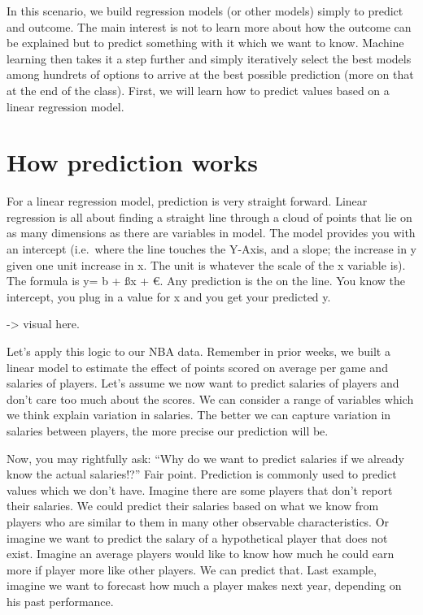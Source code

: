 \documentclass[
]{book}
\begin{document}
In this scenario, we build regression models (or other models) simply to predict and outcome. The main interest is not to learn more about how the outcome can be explained but to predict something with it which we want to know. Machine learning then takes it a step further and simply iteratively select the best models among hundrets of options to arrive at the best possible prediction (more on that at the end of the class). First, we will learn how to predict values based on a linear regression model.

\hypertarget{how-prediction-works}{%
\section{How prediction works}\label{how-prediction-works}}

For a linear regression model, prediction is very straight forward. Linear regression is all about finding a straight line through a cloud of points that lie on as many dimensions as there are variables in model. The model provides you with an intercept (i.e.~where the line touches the Y-Axis, and a slope; the increase in y given one unit increase in x. The unit is whatever the scale of the x variable is). The formula is y= b + ßx + €. Any prediction is the on the line. You know the intercept, you plug in a value for x and you get your predicted y.

-\textgreater{} visual here.

Let's apply this logic to our NBA data. Remember in prior weeks, we built a linear model to estimate the effect of points scored on average per game and salaries of players. Let's assume we now want to predict salaries of players and don't care too much about the scores. We can consider a range of variables which we think explain variation in salaries. The better we can capture variation in salaries between players, the more precise our prediction will be.

Now, you may rightfully ask: ``Why do we want to predict salaries if we already know the actual salaries!?'' Fair point. Prediction is commonly used to predict values which we don't have. Imagine there are some players that don't report their salaries. We could predict their salaries based on what we know from players who are similar to them in many other observable characteristics. Or imagine we want to predict the salary of a hypothetical player that does not exist. Imagine an average players would like to know how much he could earn more if player more like other players. We can predict that. Last example, imagine we want to forecast how much a player makes next year, depending on his past performance.
\end{document}
